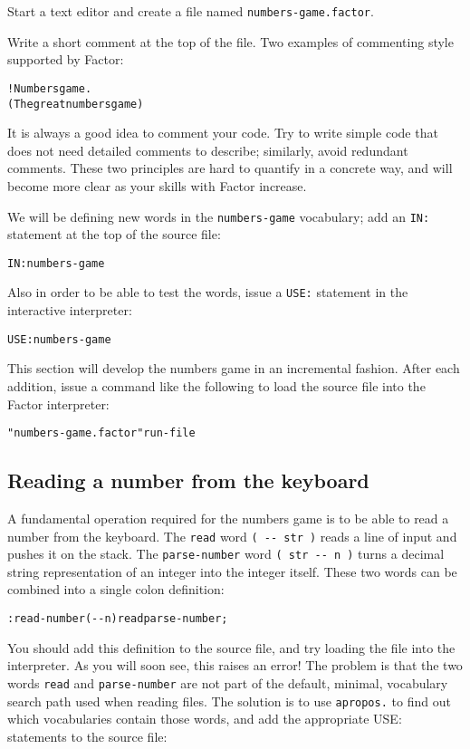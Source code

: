 \documentclass[english]{article}
\begin{document}
Start a text editor and create a file named \texttt{numbers-game.factor}.

Write a short comment at the top of the file. Two examples of commenting style supported by Factor:

\begin{alltt}
! Numbers game.
( The great numbers game )
\end{alltt}

It is always a good idea to comment your code. Try to write simple
code that does not need detailed comments to describe; similarly,
avoid redundant comments. These two principles are hard to quantify
in a concrete way, and will become more clear as your skills with
Factor increase.

We will be defining new words in the \texttt{numbers-game} vocabulary; add
an \texttt{IN:} statement at the top of the source file:

\begin{alltt}
IN: numbers-game
\end{alltt}
Also in order to be able to test the words, issue a \texttt{USE:}
statement in the interactive interpreter:

\begin{alltt}
USE: numbers-game
\end{alltt}
This section will develop the numbers game in an incremental fashion.
After each addition, issue a command like the following to load the
source file into the Factor interpreter:

\begin{alltt}
"numbers-game.factor" run-file
\end{alltt}

\subsection{Reading a number from the keyboard}

A fundamental operation required for the numbers game is to be able
to read a number from the keyboard. The \texttt{read} word \texttt{(
-{}- str )} reads a line of input and pushes it on the stack.
The \texttt{parse-number} word \texttt{( str -{}- n )} turns a decimal
string representation of an integer into the integer itself. These
two words can be combined into a single colon definition:

\begin{alltt}
: read-number ( -{}- n ) read parse-number ;
\end{alltt}
You should add this definition to the source file, and try loading
the file into the interpreter. As you will soon see, this raises an
error! The problem is that the two words \texttt{read} and \texttt{parse-number}
are not part of the default, minimal, vocabulary search path used
when reading files. The solution is to use \texttt{apropos.} to find
out which vocabularies contain those words, and add the appropriate
USE: statements to the source file:
\end{document}
